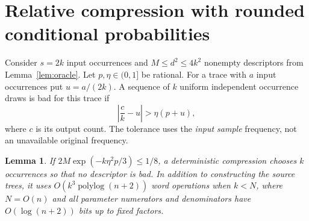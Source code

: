 \documentclass[acmsmall,11pt,nonacm,natbib=false]{acmart}
\newtheorem{lemma}[theorem]{Lemma}
\newcommand{\polylog}{\operatorname{polylog}}
\begin{document}
\section{Relative compression with rounded conditional probabilities}
Consider $s=2k$ input occurrences and $M\leq d^2\leq4k^2$ nonempty
descriptors from Lemma~\ref{lem:oracle}. Let $p,\eta\in(0,1]$ be rational.
For a trace with $a$ input occurrences put $u=a/(2k)$. A sequence of $k$
uniform independent occurrence draws is bad for this trace if
\begin{equation}\label{eq:bad}
 \left|\frac{c}{k}-u\right|>\eta(p+u),
\end{equation}
where $c$ is its output count. The tolerance uses the \emph{input sample}
frequency, not an unavailable original frequency.

\begin{lemma}\label{lem:compression}
If $2M\exp(-k\eta^2p/3)\leq1/8$, a deterministic compression chooses $k$
occurrences so that no descriptor is bad. In addition to constructing the
source trees, it uses $O(k^3\polylog(n+2))$ word operations when $k<N$,
where $N=O(n)$ and all parameter numerators and denominators have
$O(\log(n+2))$ bits up to fixed factors.
\end{lemma}
\end{document}
